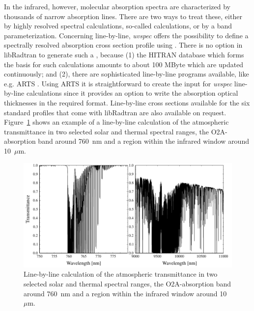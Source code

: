 In the infrared, however, molecular absorption spectra are
characterized by thousands of narrow absorption lines. There are two
ways to treat these, either by highly resolved spectral calculations,
so-called  calculations, or by a band
parameterization. Concerning line-by-line, {\sl uvspec} offers the
possibility to define a spectrally resolved absorption cross section
profile using . There is no option in
libRadtran to generate such a , because (1)
the HITRAN database which forms the basis for such calculations
amounts to about 100 MByte which are updated continuously; and (2),
there are sophisticated line-by-line programs available, like
e.g. ARTS \citep{eriksson2011}. Using ARTS it is
straightforward to create the input for {\sl uvspec} line-by-line
calculations since it provides an option to write the absorption optical
thicknesses in the required format. Line-by-line cross sections
available for the six standard profiles that come with libRadtran are
also available on request. Figure~\ref{fig:lblo2a}
shows an example of a line-by-line calculation of the
atmospheric transmittance in two selected solar and thermal spectral
ranges, the O2A-absorption band around 760~nm and a region within the
infrared window around 10~$\mu$m.

\begin{figure}
  \centering
  \includegraphics[width=1.0\hsize]{./figs/lblo2a.pdf}
  \caption{Line-by-line calculation of the
    atmospheric transmittance in two selected solar and thermal spectral
    ranges, the O2A-absorption band around 760~nm and a region within the
    infrared window around 10~$\mu$m.}
  \label{fig:lblo2a}
\end{figure}

